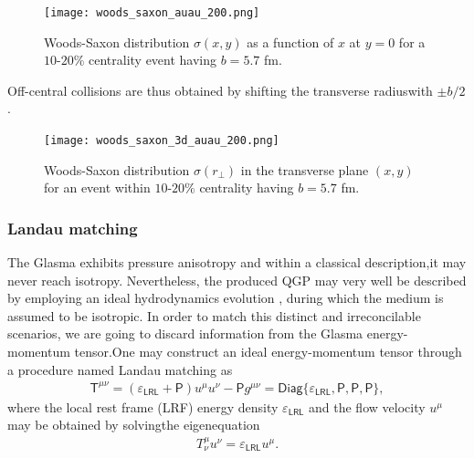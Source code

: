 \vspace{-0.3cm}

\begin{figure}[!hbt]
	\texttt{[image: woods\_saxon\_auau\_200.png]}
	\caption{\normalsize Woods-Saxon distribution $\sigma(x,y)$ as a function of $x$ at $y=0$ for a $10$-$20\%$ centrality event having $b=5.7$ fm.} 
\end{figure}

Off-central collisions are thus obtained by shifting the transverse radiuswith $\pm b/2$.

\begin{figure}[!hbt]
	\texttt{[image: woods\_saxon\_3d\_auau\_200.png]}
	\caption{\normalsize Woods-Saxon distribution $\sigma(r_\perp)$ in the transverse plane $(x,y)$ for an event within $10$-$20\%$ centrality having $b=5.7$ fm.} 
\end{figure}


\subsubsection*{Landau matching}
The Glasma exhibits pressure anisotropy and within a classical description,it may never reach isotropy. Nevertheless, the produced {\sffamily QGP} may very well be described by employing an ideal hydrodynamics evolution \cite{kolb, huovinen}, during which the medium is assumed to be isotropic. In order to match this distinct and irreconcilable scenarios, we are going to discard information from the Glasma energy-momentum tensor.One may construct an ideal energy-momentum tensor through a procedure named {\sffamily\color{ming} Landau matching} as
\begin{align*}
    \textsf{T}^{\mu \nu}=(\varepsilon_\textsf{LRL}+\textsf{P}) u^{\mu} u^{\nu}-\textsf{P} g^{\mu \nu}=\textsf{Diag}\{\varepsilon_\textsf{LRL}, \textsf{P}, \textsf{P}, \textsf{P}\},
\end{align*}
where the local rest frame ({\sffamily LRF}) energy density $\varepsilon_\textsf{LRL}$ and the flow velocity $u^\mu$ may be obtained by solvingthe eigenequation
\begin{align}\label{matt}
    T_{\nu}^{\mu} u^{\nu}=\varepsilon_\textsf{LRL} u^{\mu}.
\end{align}

